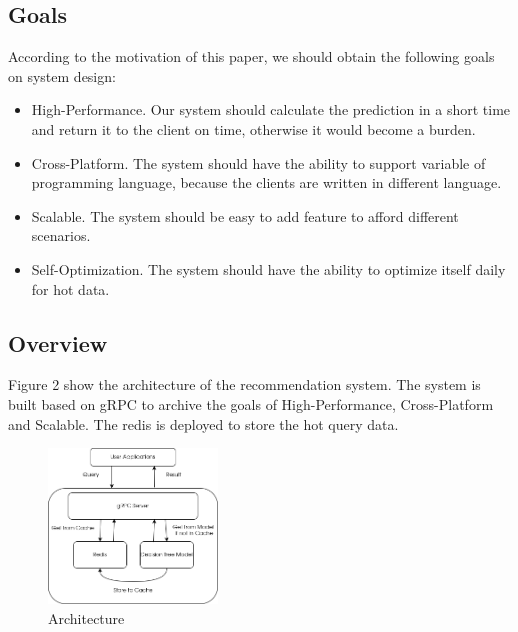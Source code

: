 \documentclass[conference]{IEEEtran}
\begin{document}
\subsection{Goals}
According to the motivation of this paper, we should obtain the following goals
on system design:
\begin{itemize}
    \item High-Performance. Our system should calculate the prediction in a short time and return it to the client on time, otherwise it would become a burden.
    \item Cross-Platform. The system should have the ability to support variable of programming language, because the clients are written in different language.
    \item Scalable. The system should be easy to add feature to afford different scenarios.
    \item Self-Optimization. The system should have the ability to optimize itself daily for hot data.
\end{itemize}

\subsection{Overview}
Figure 2 show the architecture of the recommendation system. The system is built based on gRPC 
to archive the goals of High-Performance, Cross-Platform and Scalable. The redis is deployed to store the hot query data.

\begin{figure}[htbp]
        \centering
        \includegraphics[width=0.4\textwidth]{architecture.png}
        \caption{Architecture}
\end{figure}
\end{document}

